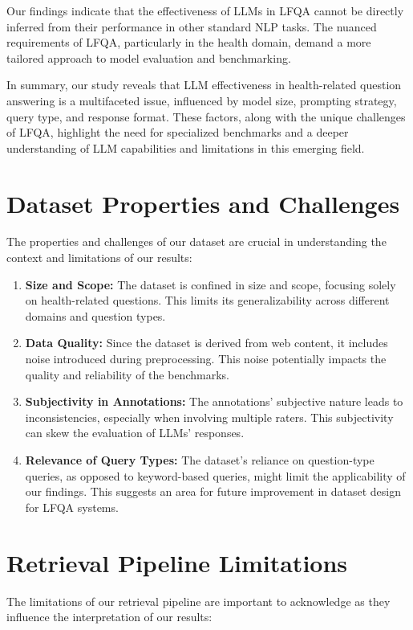 Our findings indicate that the effectiveness of LLMs in LFQA cannot be directly inferred from their performance in other standard NLP tasks. The nuanced requirements of LFQA, particularly in the health domain, demand a more tailored approach to model evaluation and benchmarking.

In summary, our study reveals that LLM effectiveness in health-related question answering is a multifaceted issue, influenced by model size, prompting strategy, query type, and response format. These factors, along with the unique challenges of LFQA, highlight the need for specialized benchmarks and a deeper understanding of LLM capabilities and limitations in this emerging field.

\section{Dataset Properties and Challenges}

The properties and challenges of our dataset are crucial in understanding the context and limitations of our results:

\begin{enumerate}
    \item \textbf{Size and Scope:} The dataset is confined in size and scope, focusing solely on health-related questions. This limits its generalizability across different domains and question types.
    \item \textbf{Data Quality:} Since the dataset is derived from web content, it includes noise introduced during preprocessing. This noise potentially impacts the quality and reliability of the benchmarks.
    \item \textbf{Subjectivity in Annotations:} The annotations' subjective nature leads to inconsistencies, especially when involving multiple raters. This subjectivity can skew the evaluation of LLMs' responses.
    \item \textbf{Relevance of Query Types:} The dataset's reliance on question-type queries, as opposed to keyword-based queries, might limit the applicability of our findings. This suggests an area for future improvement in dataset design for LFQA systems.
\end{enumerate}

\section{Retrieval Pipeline Limitations}

The limitations of our retrieval pipeline are important to acknowledge as they influence the interpretation of our results:

